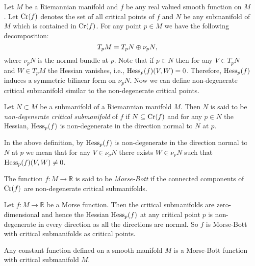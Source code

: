 \vspace{0.1cm}
\hf Let $M$ be a Riemannian manifold and $f$ be any real valued smooth function on $M$. Let $\mathrm{Cr}(f)$ denotes the set of all critical points of $f$ and $N$ be any submanifold of $M$  which is contained in $\mathrm{Cr}(f)$. For any point $p\in M$ we have the following decomposition:
\begin{displaymath}
    T_pM = T_pN \oplus \nu_pN,
\end{displaymath}
where $\nu_pN$ is the normal bundle at $p$. Note that if $p\in N$ then for any $V\in T_pN$ and $W\in T_pM$ the Hessian vanishes, i.e., $\mathrm{Hess}_p(f)(V,W)=0$. Therefore, $\mathrm{Hess}_p(f)$ induces a symmetric bilinear form on $\nu_pN$. Now we can define non-degenerate critical submanifold similar to the non-degenerate critical points. 
\begin{defn} \label{defn:nonDegenerateCriticalSubmanifolds}
    Let $N\subset M$ be a submanifold of a Riemannian manifold $M$. Then $N$ is said to be \emph{non-degenerate critical submanifold} of $f$ if $N\subseteq\mathrm{Cr}(f)$ and for any $p\in N$ the Hessian, $\mathrm{Hess}_p(f)$ is non-degenerate in the direction normal to $N$ at $p$.
\end{defn}

\vspace{0.1cm}
\hf In the above definition, by $\mathrm{Hess}_p(f)$ is non-degenerate in the direction normal to $N$ at $p$ we mean that for any $V\in \nu_pN$ there exists $W\in \nu_pN$ such that $\mathrm{Hess}_p(f)(V,W)\neq 0$.

\begin{defn} \label{defn:MorseBottFunction} 
    The function $f:M\to \mathbb{R}$ is said to be \emph{Morse-Bott} if the connected components of $\mathrm{Cr}(f)$ are non-degenerate critical submanifolds.
\end{defn}

\begin{eg}
    Let $f:M\to \mathbb{R}$ be a Morse function. Then the critical submanifolds are zero-dimensional and hence the Hessian $\mathrm{Hess}_p(f)$  at any critical point $p$ is non-degenerate in every direction as all the directions are normal. So $f$ is Morse-Bott with critical submanifolds as critical points.
\end{eg}

\begin{eg}
    Any constant function defined on a smooth manifold $M$ is a Morse-Bott function with critical submanifold $M$.
\end{eg}

